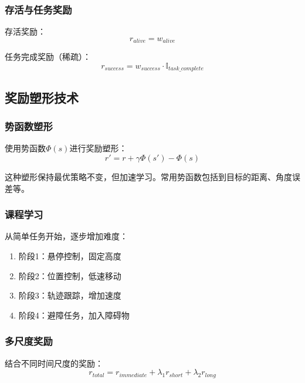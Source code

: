 \documentclass[12pt,a4paper]{ctexart}
\begin{document}
\subsubsection{存活与任务奖励}

存活奖励：
\begin{equation}
r_{alive} = w_{alive}
\end{equation}

任务完成奖励（稀疏）：
\begin{equation}
r_{success} = w_{success} \cdot \mathbb{I}_{task\_complete}
\end{equation}

\subsection{奖励塑形技术}

\subsubsection{势函数塑形}

使用势函数$\Phi(s)$进行奖励塑形：
\begin{equation}
r' = r + \gamma \Phi(s') - \Phi(s)
\end{equation}

这种塑形保持最优策略不变，但加速学习。常用势函数包括到目标的距离、角度误差等。

\subsubsection{课程学习}

从简单任务开始，逐步增加难度：
\begin{enumerate}
    \item 阶段1：悬停控制，固定高度
    \item 阶段2：位置控制，低速移动
    \item 阶段3：轨迹跟踪，增加速度
    \item 阶段4：避障任务，加入障碍物
\end{enumerate}

\subsubsection{多尺度奖励}

结合不同时间尺度的奖励：
\begin{equation}
r_{total} = r_{immediate} + \lambda_1 r_{short} + \lambda_2 r_{long}
\end{equation}
\end{document}
